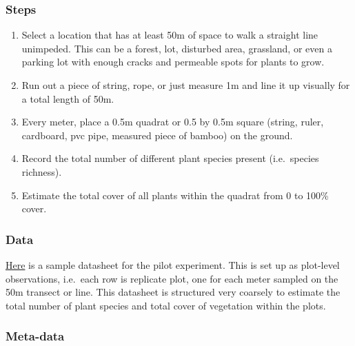 \documentclass[
]{book}
\providecommand{\tightlist}{%
  \setlength{\itemsep}{0pt}\setlength{\parskip}{0pt}}
\begin{document}
\hypertarget{steps-2}{%
\subsubsection*{Steps}\label{steps-2}}

\begin{enumerate}
\def\labelenumi{\arabic{enumi}.}
\tightlist
\item
  Select a location that has at least 50m of space to walk a straight line unimpeded. This can be a forest, lot, disturbed area, grassland, or even a parking lot with enough cracks and permeable spots for plants to grow.\\
\item
  Run out a piece of string, rope, or just measure 1m and line it up visually for a total length of 50m.\\
\item
  Every meter, place a 0.5m quadrat or 0.5 by 0.5m square (string, ruler, cardboard, pvc pipe, measured piece of bamboo) on the ground.\\
\item
  Record the total number of different plant species present (i.e.~species richness).\\
\item
  Estimate the total cover of all plants within the quadrat from 0 to 100\% cover.
\end{enumerate}

\hypertarget{data-2}{%
\subsubsection*{Data}\label{data-2}}

\href{https://figshare.com/articles/dataset/BIOL3250_survey_datasheet/12792482}{Here} is a sample datasheet for the pilot experiment. This is set up as plot-level observations, i.e.~each row is replicate plot, one for each meter sampled on the 50m transect or line. This datasheet is structured very coarsely to estimate the total number of plant species and total cover of vegetation within the plots.

\hypertarget{meta-data-2}{%
\subsubsection*{Meta-data}\label{meta-data-2}}
\end{document}
